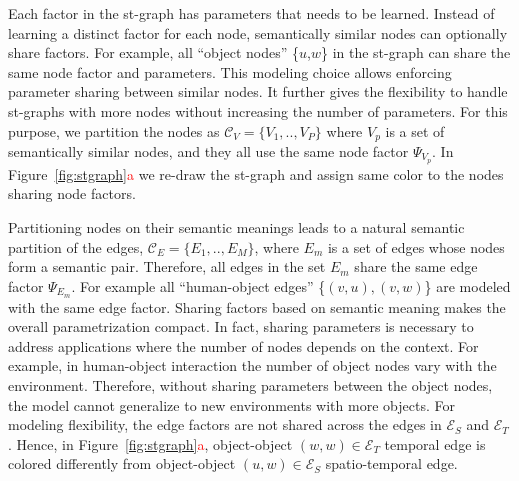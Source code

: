 \documentclass[10pt,twocolumn,letterpaper]{article}
\newcommand{\mcal}[1]{\mathcal{#1}}
\newcommand{\rc}[1]{\textcolor{red}{#1}}
\begin{document}
Each factor in the st-graph has parameters that needs to be learned. Instead of learning a distinct factor for each node, semantically similar nodes can optionally share factors. For example, all ``object nodes'' \{$u$,$w$\} in the st-graph can share the same node factor and parameters. This modeling choice allows enforcing parameter sharing between similar nodes.
It further gives the flexibility to handle st-graphs with more nodes without increasing the number of parameters. For this purpose, we partition the nodes as $\mcal{C}_V=\{V_1,..,V_P\}$ where $V_p$ is a set of semantically similar nodes, and they all use the same node factor $\Psi_{V_p}$. In Figure~\ref{fig:stgraph}\rc{a} we re-draw the st-graph and assign same color to the nodes sharing node factors. 

Partitioning nodes on their semantic meanings leads to a natural semantic partition of the edges, $\mcal{C}_E=\{E_1,..,E_M\}$, where $E_m$ is a set of edges whose nodes form a semantic pair. Therefore, all edges in the set $E_m$  share the same edge factor $\Psi_{E_m}$. For example all ``human-object edges'' \{$(v,u), (v,w)$\} are modeled with the same edge factor.  Sharing factors based on semantic meaning makes the overall parametrization compact. In fact, sharing parameters is necessary to address applications where the number of nodes depends on the context. For example, in human-object interaction the number of object nodes vary with the environment. Therefore, without sharing parameters between the object nodes, the model cannot generalize to new environments with more objects. For modeling flexibility, the edge factors are not shared across the edges in $\mcal{E}_S$ and $\mcal{E}_T$. Hence, in Figure~\ref{fig:stgraph}\rc{a}, object-object $(w,w)\in\mcal{E}_T$ temporal edge is colored differently from object-object $(u,w) \in \mcal{E}_S$ spatio-temporal edge.%
\end{document}
